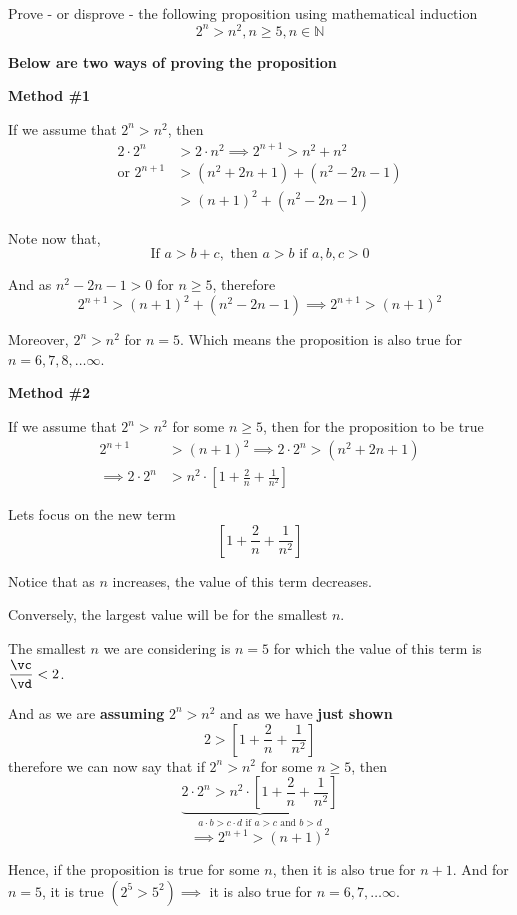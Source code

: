 
\question[3] Prove - or disprove - the following proposition using mathematical induction 
\[ 2^n > n^2, n\geq 5, n\in\mathbb{N} \]

\insertQR{}

\va\vb
\FRACADD\va{}\vc\vd

\begin{solution}[\halfpage]
  \textbf{Below are two ways of proving the proposition}

  \textbf{Method \#1}

  If we assume that $2^n > n^2$, then 
  \begin{align}
    2\cdot 2^n &> 2\cdot n^2 \implies 2^{n+1} > n^2 + n^2 \\
    \text{or } 2^{n+1} &> (n^2 + 2n + 1) + (n^2 - 2n - 1) \\
     &> (n+1)^2 + (n^2 - 2n - 1) 
  \end{align}

  Note now that,
    \[\text{If } a > b + c, \text{ then } a > b \text{ if } a,b,c > 0 \]

  And as $n^2 - 2n - 1 > 0$ for $n\geq 5$, therefore 
    \[ 2^{n+1} > (n+1)^2 + (n^2-2n-1) \implies 2^{n+1} > (n+1)^2 \] 

  Moreover, $2^n > n^2$ for $n=5$. Which means the proposition is also true for $n=6,7,8,\ldots\infty$.

  \textbf{Method \#2}

  If we assume that  $2^n > n^2$ for some $n\geq 5$, then for the proposition to be true
  \begin{align}
    2^{n+1} &> (n+1)^2\implies 2\cdot 2^n > (n^2 + 2n + 1) \\
    \implies 2\cdot 2^n &> n^2\cdot\left[ 1 + \frac{2}{n} + \frac{1}{n^2} \right]
  \end{align}

  Lets focus on the new term 
  \[\left[ 1+\frac{2}{n}+\frac{1}{n^2} \right]\]

  Notice that as $n$ increases, the value of this term decreases. 

  Conversely, the largest value will be for the smallest $n$. 

  The smallest $n$ we are considering is $n=5$ for which the value of 
  this term is $\dfrac\vc\vd < 2$.

  And as we are \textbf{assuming} $2^n > n^2$ and as we have \textbf{just shown}
  \[ 2 > \left[ 1 + \frac{2}{n} + \frac{1}{n^2} \right] \]
  therefore we can now say that if $2^n > n^2$ for some $n\geq 5$, then
  \[ \underbrace{2\cdot 2^n > n^2\cdot\left[ 1 + \frac{2}{n} + \frac{1}{n^2} \right]}
  _{a\cdot b > c\cdot d\text{ if } a > c\text{ and } b > d }\]
  \[\implies 2^{n+1} > (n+1)^2\]

  Hence, if the proposition is true for some $n$, then it is also true for $n+1$. 
  And for $n=5$, it is true $(2^5>5^2)\implies$ it is also true for $n=6,7,\ldots\infty$.
  
\end{solution}

